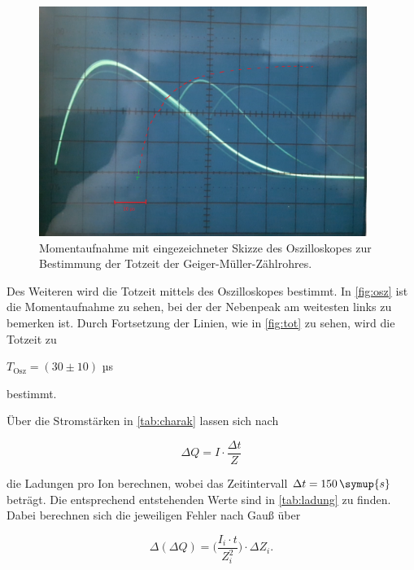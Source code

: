 \begin{figure}
  \centering
  \includegraphics[width=0.95\textwidth]{content/osz_m_skizze.png}
  \caption{Momentaufnahme mit eingezeichneter Skizze des Oszilloskopes zur Bestimmung der Totzeit der Geiger-Müller-Zählrohres.}
  \label{fig:osz-m-skizze}
\end{figure}

Des Weiteren wird die Totzeit mittels des Oszilloskopes bestimmt. In \autoref{fig:osz} ist die Momentaufnahme zu sehen, bei der der Nebenpeak am weitesten links zu bemerken ist.
Durch Fortsetzung der Linien, wie in \autoref{fig:tot} zu sehen, wird die Totzeit zu

\begin{center}
    $T_\text{Osz} = (30 \pm 10)$ µs
\end{center}

bestimmt.

Über die Stromstärken in \autoref{tab:charak} lassen sich nach 

\begin{equation}
    \Delta Q = I \cdot \frac{\Delta t}{Z}
\end{equation}

die Ladungen pro Ion berechnen, 
wobei das Zeitintervall $\Delta t = 150 \, \symup{s}$ beträgt.
Die entsprechend entstehenden Werte sind in \autoref{tab:ladung} zu finden.
Dabei berechnen sich die jeweiligen Fehler nach Gauß über

\begin{equation}
    \Delta (\Delta Q) = \bigg( \frac{I_i \cdot t}{Z_i^2} \bigg) \cdot \Delta Z_i.
\end{equation}

